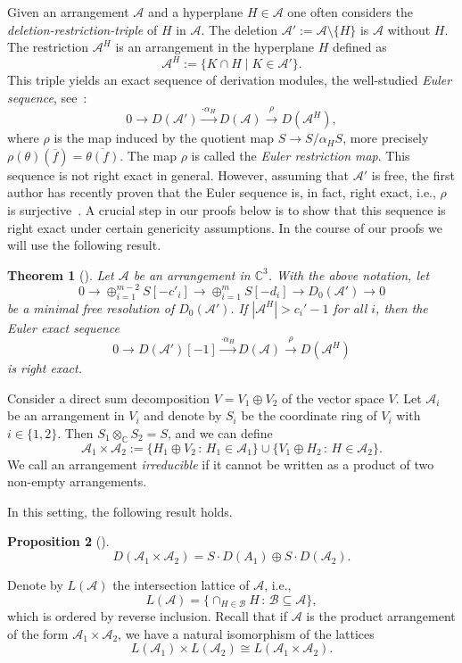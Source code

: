 \documentclass[a4paper,11pt]{amsart}
\def\CC{{\mathbb{C}}}%
\def\C{{\mathbb{C}}}%
\def\A{{\mathcal{A}}}%
\def\C{{\mathcal{C}}}%
\numberwithin{equation}{section}
\newtheorem{theorem}{Theorem}[section]
\newtheorem{prop}[theorem]{Proposition}
\theoremstyle{remark}
\begin{document}
Given an arrangement $\A$ and a hyperplane $H\in \A$ one often considers the \emph{deletion-restriction-triple} of $H$ in $\A$.
The deletion $\A' := \A\setminus\{H\}$ is $\A$ without $H$.
The restriction $\A^H$ is an arrangement in the hyperplane $H$ defined as
\[
	\A^H := \{K\cap H \mid K\in \A' \}.
\]
This triple yields an exact sequence of derivation modules, the well-studied \emph{Euler sequence}, see~\cite[Prop. 4.45]{OT}:
\[
0\to D(\A')\stackrel{\cdot \alpha_{H}}{\longrightarrow} D(\A) \stackrel{\rho}{\longrightarrow} D(\A^H),
\]
where $\rho$ is the map induced by the quotient map $S\to S/\alpha_{H}S$, more precisely $\rho(\theta)(\overline{f}) = \overline{\theta(f)}$. The map $\rho$ is called the \textit{Euler restriction map}.
This sequence is not right exact in general. However, assuming that $\A'$ is free, the first author has recently proven that the Euler sequence is, in fact, right exact, i.e., $\rho$ is surjective~\cite{Abe24}. A crucial step in our proofs below is to show that this sequence is right exact under certain genericity assumptions. In the course of our proofs we will use the following result. 
\begin{theorem}[{\cite[Theorem~2.5]{ADP}}]
Let $\A$ be an arrangement in $\CC^3$.
\label{ADPTT}
With the above notation, let 
$$
0 \rightarrow \oplus_{i=1}^{m-2} S[-c'_i]
\rightarrow \oplus_{i=1}^m S[-d_i]
\rightarrow D_0(\A') \rightarrow 0
$$
be a minimal free resolution of $D_0(\A')$. If $|\A^{H}|>c_i'-1$ for all $i$, then
the Euler exact sequence 
$$
0 \rightarrow D(\A')[-1]
\stackrel{\cdot \alpha_H}{\longrightarrow} D(\A)
\stackrel{\rho}{\longrightarrow} D(\A^{H}) 
$$
is right exact.
\end{theorem}


Consider a direct sum decomposition $V = V_{1} \oplus V_{2}$ of the vector space $V$. Let $\mathcal{A}_{i}$ be an arrangement in $V_{i}$ and denote by $S_{i}$ be the coordinate ring of $V_{i}$ with $i \in \{1,2\}$. 
Then $S_{1} \otimes_{\mathbb{C}}S_{2} = S$, and we can define
$$\mathcal{A}_{1} \times \mathcal{A}_{2} := \{H_{1} \oplus V_{2} \, : \, H_{1} \in \mathcal{A}_{1}\} \cup \{V_{1} \oplus H_{2} \, : \, H \in \mathcal{A}_{2}\}.$$
We call an arrangement \emph{irreducible} if it cannot be written as a product of two non-empty arrangements.

In this setting, the following result holds.
\begin{prop}[{\cite[Proposition 4.14]{OT}}]
\label{deradd}
$$D(\mathcal{A}_{1} \times \mathcal{A}_{2}) = S\cdot D(A_{1}) \oplus S\cdot D(\mathcal{A}_{2}).$$
\end{prop}
\noindent
Denote by $L(\mathcal{A})$ the intersection lattice of $\mathcal{A}$, i.e.,
$$L(\mathcal{A}) = \{ \cap_{H \in \mathcal{B}}H \, : \, \mathcal{B} \subseteq \mathcal{A}\},$$
which is ordered by reverse inclusion.
Recall that if $\mathcal{A}$ is the product arrangement of the form $\mathcal{A}_{1} \times \mathcal{A}_{2}$, we have a natural isomorphism of the lattices
\begin{equation}
\label{latadd}
L(\mathcal{A}_{1}) \times L(\mathcal{A}_{2}) \cong L(\mathcal{A}_{1} \times \mathcal{A}_{2}).
\end{equation}
\end{document}
